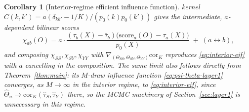 \documentclass[11pt]{article}
\theoremstyle{plain}
\newtheorem{corollary}[theorem]{Corollary}
\theoremstyle{definition}
\theoremstyle{remark}
\newcommand{\Thetahat}{\widehat{\Theta}}
\newcommand{\Corr}{\mathrm{cor}}
\begin{document}
\begin{corollary}[Interior-regime efficient influence function]
kernel $C(k,k')=a(\delta_{kk'}-1/K)/(p_0(k)p_0(k'))$ gives the intermediate,
$a$-dependent bilinear scores
\begin{equation}\label{eq:interior-chi-ab}
    \chi_{ab}(O) = a\cdot\frac{(\tau_b(X)-\bar\tau_b)\big(\mathrm{score}_a(O)-\tau_a(X)\big)}{p_0(X)}
    \;+\; (a\leftrightarrow b),
\end{equation}
and composing $\chi_{SS},\chi_{SY},\chi_{YY}$ with $\nabla_{(\Theta_{SS},\Theta_{SY},\Theta_{YY})}\Corr_K$
reproduces \eqref{eq:interior-eif} with $a$ cancelling in the composition. The same
limit also follows directly from Theorem~\ref{thm:main}: its $M$-draw influence
function \eqref{eq:psi-theta-layer1} converges, as $M\to\infty$ in the interior
regime, to \eqref{eq:interior-eif}, since $\Thetahat_n\to\Corr_K(\hat\tau_S,\hat\tau_Y)$
there, so the MCMC machinery of Section~\ref{sec:layer1} is unnecessary in this
regime.
\end{corollary}
\end{document}
